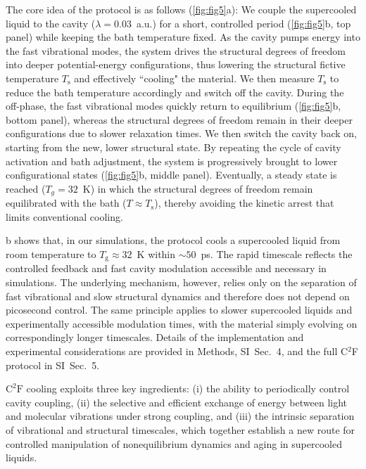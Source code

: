 \documentclass[aps, prl,
 reprint,
 superscriptaddress,
 citeautoscript,
 amsmath,amssymb,
 tightenlines
]{revtex4-2}
\begin{document}
The core idea of the protocol is as follows (\cref{fig:fig5}a): We couple the supercooled liquid to the cavity ($\lambda = 0.03$~a.u.) for a short, controlled period (\cref{fig:fig5}b, top panel) while keeping the bath temperature fixed. 
As the cavity pumps energy into the fast vibrational modes, the system drives the structural degrees of freedom into deeper potential-energy configurations, thus lowering the structural fictive temperature $T_\mathrm{s}$ and effectively ``cooling" the material. 
We then measure $T_\mathrm{s}$ to reduce the bath temperature accordingly and switch off the cavity. 
During the off-phase, the fast vibrational modes quickly return to equilibrium (\cref{fig:fig5}b, bottom panel), whereas the structural degrees of freedom remain in their deeper configurations due to slower relaxation times. 
We then switch the cavity back on, starting from the new, lower structural state. 
By repeating the cycle of cavity activation and bath adjustment, the system is progressively brought to lower configurational states (\cref{fig:fig5}b, middle panel). 
Eventually, a steady state is reached ($T_g=32$~K) in which the structural degrees of freedom remain equilibrated with the bath ($T \approx T_\mathrm{s}$), thereby avoiding the kinetic arrest that limits conventional cooling.


b shows that, in our simulations, the protocol cools a supercooled liquid from room temperature to $T_\mathrm{g} \approx 32$~K within $\sim 50$~ps. The rapid timescale reflects the controlled feedback and fast cavity modulation accessible and necessary in simulations. The underlying mechanism, however, relies only on the separation of fast vibrational and slow structural dynamics and therefore does not depend on picosecond control. The same principle applies to slower supercooled liquids and experimentally accessible modulation times,\cite{dutta2017alloptical,stone2020optical,yavorskiy2025terahertz} with the material simply evolving on correspondingly longer timescales. Details of the implementation and experimental considerations are provided in Methods, SI~Sec.~4, and the full C$^2$F protocol in SI~Sec.~5.

$\mathrm{C^2F}$ cooling exploits three key ingredients: (i) the ability to periodically control cavity coupling, (ii) the selective and efficient exchange of energy between light and molecular vibrations under strong coupling, and (iii) the intrinsic separation of vibrational and structural timescales, which together establish a new route for controlled manipulation of nonequilibrium dynamics and aging in supercooled liquids.
\end{document}
